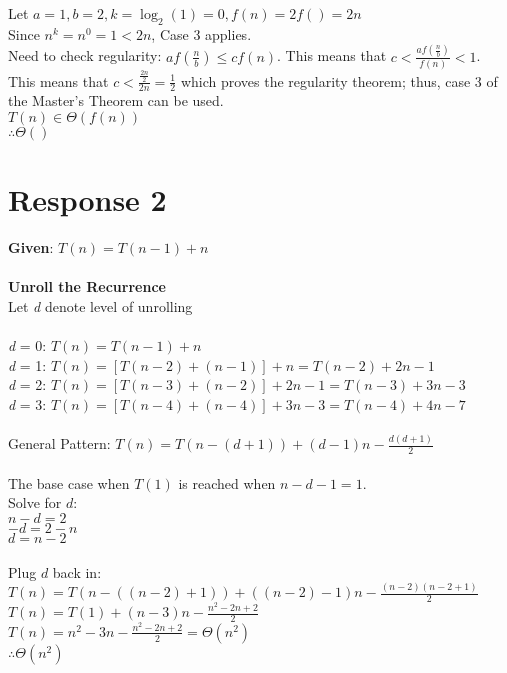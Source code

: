 \documentclass[12pt, a4paper]{article}
\begin{document}
    Let \(a = 1, b = 2, k = \log_{2}(1) = 0, f(n) = 2f() = 2n\)\\
    Since \(n^{k} = n^{0} = 1 < 2n\), Case 3 applies.\\ 
    Need to check regularity: \(af(\frac{n}{b}) \leq cf(n)\). 
    This means that \(c < \frac{af(\frac{n}{b})}{f(n)} < 1\).
    This means that \(c < \frac{\frac{2n}{2}}{2n} = \frac{1}{2} \) which proves the regularity theorem; thus, case 3 of the Master's Theorem can be used.\\
    \(T(n) \in \Theta(f(n))\)\\
    \(\therefore \Theta()\) 
    \newpage
    
\section*{\centering Response 2}
    \textbf{Given}: \(T(n) = T(n-1) + n\)\\
    \\
    \textbf{Unroll the Recurrence}\\
    Let \textit{d} denote level of unrolling\\
    \\
    \textit{d} = 0: \(T(n) = T(n-1) + n\)\\
    \textit{d} = 1: \(T(n) = [T(n-2) + (n-1)] + n = T(n-2) + 2n - 1\)\\
    \textit{d} = 2: \(T(n) = [T(n-3) + (n-2)] + 2n - 1 = T(n-3) + 3n - 3\)\\
    \textit{d} = 3: \(T(n) = [T(n-4) + (n-4)] + 3n - 3 = T(n-4) + 4n - 7\)\\
    \\
    General Pattern: \(T(n) = T(n - (d + 1)) + (d - 1)n - \frac{d(d+1)}{2}\)\\
    \\
    The base case when \(T(1)\) is reached when \(n-d - 1 = 1\).\\
    Solve for \(d\): \\
    \(n - d = 2\)\\
    \(-d = 2-n\)\\
    \(d=n-2\) \\
    \\
    Plug \(d\) back in:\\
    \(T(n)=T(n-((n-2)+1))+((n-2)-1)n-\frac{(n-2)(n - 2 + 1)}{2}\)\\
    \(T(n)=T(1)+(n-3)n-\frac{n^2-2n+2}{2}\)\\
    \(T(n)=n^2-3n-\frac{n^2-2n+2}{2} = \Theta{(n^2)}\)\\
    \(\therefore \Theta{(n^2)}\)
    \newpage
\end{document}
